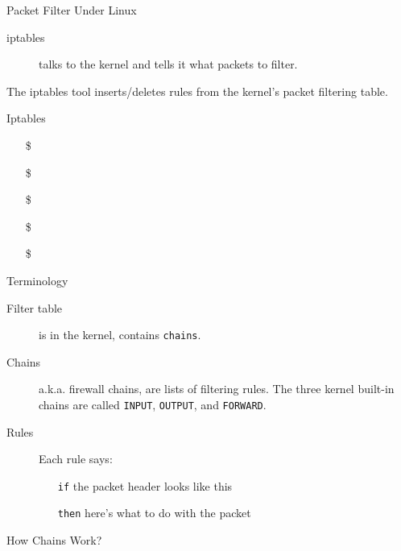 \begin{frame}{Packet Filter Under Linux}
  \begin{description}
  \item[iptables] talks to the kernel and tells it what packets to filter.
  \end{description}
  The iptables tool inserts/deletes rules from the kernel's packet filtering table.
\end{frame}

\begin{frame}{Iptables}
  \begin{itemize}
  \item[\$] 
  \item[\$] 
  \item[\$] 
  \item[\$] 
  \item[\$] 
  \end{itemize}
\end{frame}

\begin{frame}{Terminology}
  \begin{description}
  \item[Filter table] is in the kernel, contains \texttt{chains}.
  \item[Chains] a.k.a. firewall chains, are lists of filtering rules. The three kernel
    built-in chains are called \texttt{INPUT}, \texttt{OUTPUT}, and \texttt{FORWARD}.
  \item[Rules] Each rule says:
    \begin{itemize}
    \item[\texttt{if}] the packet header looks like this
    \item[\texttt{then}] here's what to do with the packet
    \end{itemize}
  \end{description}
\end{frame}

\begin{frame}{How Chains Work?}
  \centering
\end{frame}


